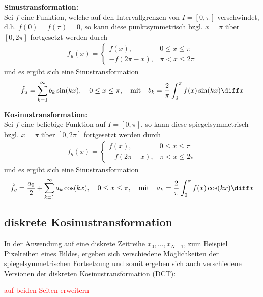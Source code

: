 \textbf{Sinustransformation:} \\
Sei $f$ eine Funktion, welche auf den Intervallgrenzen von $I=[0,\pi]$ verschwindet, d.h. $f(0)=f(\pi)=0$, so kann 
diese punktsymmetrisch bzgl. $x=\pi$ über $[0,2\pi]$ fortgesetzt werden durch 
%
\begin{align*}
  f_u(x) = \begin{cases}
    f(x), & 0\leq x \leq \pi \\
    -f(2\pi-x), &\pi < x \leq 2\pi
  \end{cases}
\end{align*}
%
und es ergibt sich eine Sinustransformation 
%
\begin{align*}
  \hat{f}_u = \sum_{k=1}^{\infty} b_k\sin(kx), 
  \quad 0\leq x\leq \pi, 
  \quad\text{mit}\quad b_k = \dfrac{2}{\pi}\int_{0}^{\pi} f(x) \sin(kx) \diff x
\end{align*}
%

\textbf{Kosinustransformation:} \\
Sei $f$ eine beliebige Funktion auf $I=[0,\pi]$, so kann 
diese spiegelsymmetrisch bzgl. $x=\pi$ über $[0,2\pi]$ fortgesetzt werden durch 
%
\begin{align*}
  f_g(x) = \begin{cases}
    f(x), & 0\leq x \leq \pi \\
    -f(2\pi-x), &\pi < x \leq 2\pi
  \end{cases}
\end{align*}
%
und es ergibt sich eine Sinustransformation 
%
\begin{align*}
  \hat{f}_g = \dfrac{a_0}{2} + \sum_{k=1}^{\infty} a_k\cos(kx), 
  \quad 0\leq x\leq \pi, 
  \quad\text{mit}\quad a_k = \dfrac{2}{\pi}\int_{0}^{\pi} f(x) \cos(kx) \diff x
\end{align*}
%

\subsection{diskrete Kosinustransformation}

In der Anwendung auf eine diskrete Zeitreihe $x_0,\dots,x_{N-1}$, zum Beispiel Pixelreihen eines Bildes, ergeben 
sich verschiedene Möglichkeiten der spiegelsymmetrischen Fortsetzung und somit ergeben sich auch verschiedene 
Versionen der diskreten Kosinustransformation (DCT):

\textcolor{red}{auf beiden Seiten erweitern}

